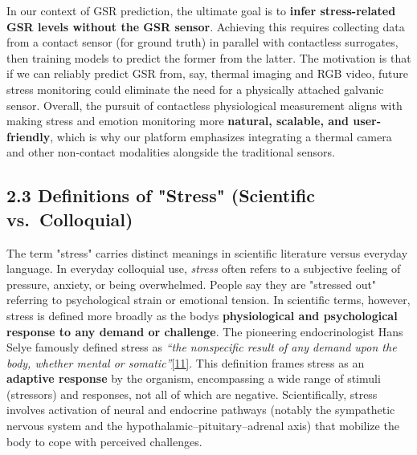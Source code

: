 \documentclass[12pt,a4paper]{article}
\begin{document}
In our context of GSR prediction, the ultimate goal is to \textbf{infer stress-related GSR levels without the GSR sensor}. Achieving this requires collecting data from a contact sensor (for ground truth) in parallel with contactless surrogates, then training models to predict the former from the latter. The motivation is that if we can reliably predict GSR from, say, thermal imaging and RGB video, future stress monitoring could eliminate the need for a physically attached galvanic sensor. Overall, the pursuit of contactless physiological measurement aligns with making stress and emotion monitoring more \textbf{natural, scalable, and user-friendly}, which is why our platform emphasizes integrating a thermal camera and other non-contact modalities alongside the traditional sensors.

\subsection{2.3 Definitions of "Stress" (Scientific vs.~Colloquial)}\label{definitions-of-stress-scientific-vs.-colloquial}

The term "stress" carries distinct meanings in scientific literature versus everyday language. In everyday colloquial use, \emph{stress} often refers to a subjective feeling of pressure, anxiety, or being overwhelmed. People say they are "stressed out" referring to psychological strain or emotional tension. In scientific terms, however, stress is defined more broadly as the body\textquotesingle s \textbf{physiological and psychological response to any demand or challenge}. The pioneering endocrinologist Hans Selye famously defined stress as \emph{``the nonspecific result of any demand upon the body, whether mental or somatic''}\href{Selye1956}{{[}11{]}}. This definition frames stress as an \textbf{adaptive response} by the organism, encompassing a wide range of stimuli (stressors) and responses, not all of which are negative. Scientifically, stress involves activation of neural and endocrine pathways (notably the sympathetic nervous system and the hypothalamic--pituitary--adrenal axis) that mobilize the body to cope with perceived challenges.
\end{document}
